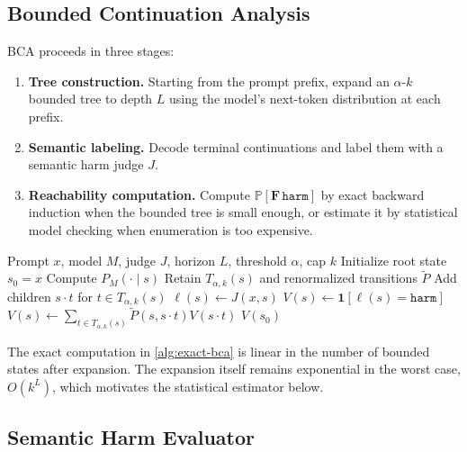 \documentclass[11pt]{article}
\newcommand{\Prob}{\mathbb{P}}
\newcommand{\ind}{\mathbf{1}}
\newcommand{\harm}{\texttt{harm}}
\newcommand{\BCA}{\textsc{BCA}}
\begin{document}
\subsection{Bounded Continuation Analysis}

\BCA{} proceeds in three stages:

\begin{enumerate}[leftmargin=*,itemsep=2pt]
  \item \textbf{Tree construction.} Starting from the prompt prefix, expand an $\alpha$-$k$ bounded tree to depth $L$ using the model's next-token distribution at each prefix.
  \item \textbf{Semantic labeling.} Decode terminal continuations and label them with a semantic harm judge $J$.
  \item \textbf{Reachability computation.} Compute $\Prob[\mathbf{F}\,\harm]$ by exact backward induction when the bounded tree is small enough, or estimate it by statistical model checking when enumeration is too expensive.
\end{enumerate}

\begin{algorithm}[t]
\caption{Exact bounded continuation analysis}
\label{alg:exact-bca}
\begin{algorithmic}[1]
\Require Prompt $x$, model $M$, judge $J$, horizon $L$, threshold $\alpha$, cap $k$
\State Initialize root state $s_0=x$
    \State Compute $P_M(\cdot\mid s)$
    \State Retain $T_{\alpha,k}(s)$ and renormalized transitions $\widetilde P$
    \State Add children $s\cdot t$ for $t\in T_{\alpha,k}(s)$
  \EndFor
\EndFor
{}
  \State $\ell(s)\gets J(x,s)$
  \State $V(s)\gets \ind[\ell(s)=\harm]$
\EndFor
{}
    \State $V(s)\gets \sum_{t\in T_{\alpha,k}(s)} \widetilde P(s,s\cdot t)V(s\cdot t)$
  \EndFor
\EndFor
\State \Return $V(s_0)$
\end{algorithmic}
\end{algorithm}

The exact computation in \cref{alg:exact-bca} is linear in the number of bounded states after expansion.  The expansion itself remains exponential in the worst case, $O(k^L)$, which motivates the statistical estimator below.

\subsection{Semantic Harm Evaluator}
\end{document}
